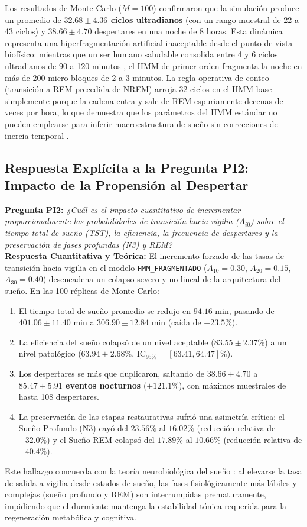 \documentclass[11pt,a4paper]{article}
\begin{document}
Los resultados de Monte Carlo ($M=100$) confirmaron que la simulación produce un promedio de \textbf{$32.68 \pm 4.36$ ciclos ultradianos} (con un rango muestral de 22 a 43 ciclos) y $38.66 \pm 4.70$ despertares en una noche de 8 horas. Esta dinámica representa una hiperfragmentación artificial inaceptable desde el punto de vista biofísico: mientras que un ser humano saludable consolida entre 4 y 6 ciclos ultradianos de 90 a 120 minutos \cite{carska2011, aasm2020}, el HMM de primer orden fragmenta la noche en más de 200 micro-bloques de 2 a 3 minutos. La regla operativa de conteo (transición a REM precedida de NREM) arroja 32 ciclos en el HMM base simplemente porque la cadena entra y sale de REM espuriamente decenas de veces por hora, lo que demuestra que los parámetros del HMM estándar no pueden emplearse para inferir macroestructura de sueño sin correcciones de inercia temporal \cite{prerau2017, flexer2005}.

\subsection{Respuesta Explícita a la Pregunta PI2: Impacto de la Propensión al Despertar}
\noindent\textbf{Pregunta PI2:} \textit{¿Cuál es el impacto cuantitativo de incrementar proporcionalmente las probabilidades de transición hacia vigilia ($A_{i0}$) sobre el tiempo total de sueño (TST), la eficiencia, la frecuencia de despertares y la preservación de fases profundas (N3) y REM?}\\[0.15cm]
\noindent\textbf{Respuesta Cuantitativa y Teórica:} El incremento forzado de las tasas de transición hacia vigilia en el modelo \texttt{HMM\_FRAGMENTADO} ($A_{10} = 0.30$, $A_{20} = 0.15$, $A_{30} = 0.40$) desencadena un colapso severo y no lineal de la arquitectura del sueño. En las 100 réplicas de Monte Carlo:
\begin{enumerate}[leftmargin=*,itemsep=1pt]
    \item El tiempo total de sueño promedio se redujo en $94.16\text{ min}$, pasando de $401.06 \pm 11.40\text{ min}$ a $306.90 \pm 12.84\text{ min}$ (caída de $-23.5\%$).
    \item La eficiencia del sueño colapsó de un nivel aceptable ($83.55 \pm 2.37\%$) a un nivel patológico ($63.94 \pm 2.68\%$, $\mathrm{IC}_{95\%} = [63.41, 64.47]\%$).
    \item Los despertares se más que duplicaron, saltando de $38.66 \pm 4.70$ a \textbf{$85.47 \pm 5.91$ eventos nocturnos} ($+121.1\%$), con máximos muestrales de hasta 108 despertares.
    \item La preservación de las etapas restaurativas sufrió una asimetría crítica: el Sueño Profundo (N3) cayó del $23.56\%$ al $16.02\%$ (reducción relativa de $-32.0\%$) y el Sueño REM colapsó del $17.89\%$ al $10.66\%$ (reducción relativa de $-40.4\%$).
\end{enumerate}
Este hallazgo concuerda con la teoría neurobiológica del sueño \cite{borbely1982}: al elevarse la tasa de salida a vigilia desde estados de sueño, las fases fisiológicamente más lábiles y complejas (sueño profundo y REM) son interrumpidas prematuramente, impidiendo que el durmiente mantenga la estabilidad tónica requerida para la regeneración metabólica y cognitiva.
\end{document}
